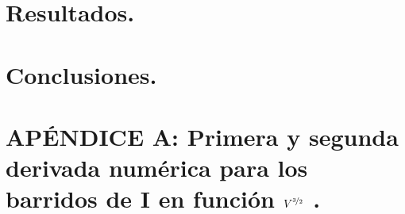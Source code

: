 \documentclass[letterpaper,spanish,reprint,nofootinbib,showkeys,aps]{revtex4-2}
\begin{document}


\section{Resultados.}\label{sec:resdis}




\section{Conclusiones.}\label{sec:conclusiones}



\vfill
\pagebreak

\onecolumngrid


\section{APÉNDICE A: Primera y segunda derivada numérica para los barridos de I en función $V^{\nicefrac{3}{2}}$ .}





\end{document}
